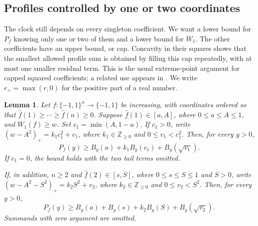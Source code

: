 \documentclass[11pt,letterpaper]{amsart}
\newcommand{\1}{\mathbf 1}
\newtheorem{lemma}[theorem]{Lemma}
\numberwithin{equation}{section}
\begin{document}
\subsection{Profiles controlled by one or two coordinates}

The clock still depends on every singleton coefficient. We want a
lower bound for $P_f$ knowing only one or two of them and a lower
bound for $W_1$. The other coefficients have an upper bound, or cap.
Concavity in their squares shows that the smallest allowed profile
sum is obtained by filling this cap repeatedly, with at most one
smaller residual term.
This is the usual extreme-point argument for capped squared
coefficients; a related use appears in
\cite[proof of Theorem~2]{JavanmardWoodruff2026}.
We write $r_+=\max(r,0)$ for the positive part of a real number.

\begin{lemma}\label{jp:profile}
Let $f:\{-1,1\}^n\to\{-1,1\}$ be increasing, with coordinates
ordered so that
$\widehat f(1)\ge\cdots\ge\widehat f(n)\ge0$.
Suppose $\widehat f(1)\in[a,A]$, where $0\le a\le A\le1$,
and $W_1(f)\ge w$.
Set $c_1=\min(A,1-a)$.
If $c_1>0$, write
$(w-A^2)_+=k_1c_1^2+v_1$, where
$k_1\in\mathbb Z_{\ge0}$ and $0\le v_1<c_1^2$.
Then, for every $y>0$,
\[
 P_f(y)\ge B_y(a)+k_1B_y(c_1)+B_y(\sqrt{v_1}).
\]
If $c_1=0$, the bound holds with the two tail terms omitted.

If, in addition, $n\ge2$ and $\widehat f(2)\in[s,S]$,
where $0\le s\le S\le1$ and $S>0$, write
$(w-A^2-S^2)_+=k_2S^2+v_2$, where
$k_2\in\mathbb Z_{\ge0}$ and $0\le v_2<S^2$.
Then, for every $y>0$,
\[
 P_f(y)\ge B_y(a)+B_y(s)+k_2B_y(S)+B_y(\sqrt{v_2}).
\]
Summands with zero argument are omitted.
\end{lemma}
\end{document}
